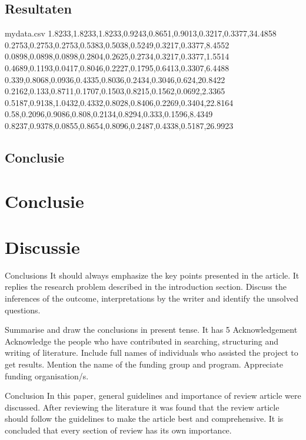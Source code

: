 \documentclass{article}
\begin{document}
	\subsection{Resultaten}
	 \begin{filecontents*}{mydata.csv}
		1.8233,1.8233,1.8233,0.9243,0.8651,0.9013,0.3217,0.3377,34.4858
		0.2753,0.2753,0.2753,0.5383,0.5038,0.5249,0.3217,0.3377,8.4552
		0.0898,0.0898,0.0898,0.2804,0.2625,0.2734,0.3217,0.3377,1.5514
		0.4689,0.1193,0.0417,0.8046,0.2227,0.1795,0.6413,0.3307,6.4488
		0.339,0.8068,0.0936,0.4335,0.8036,0.2434,0.3046,0.624,20.8422
		0.2162,0.133,0.8711,0.1707,0.1503,0.8215,0.1562,0.0692,2.3365
		0.5187,0.9138,1.0432,0.4332,0.8028,0.8406,0.2269,0.3404,22.8164
		0.58,0.2096,0.9086,0.808,0.2134,0.8294,0.333,0.1596,8.4349
		0.8237,0.9378,0.0855,0.8654,0.8096,0.2487,0.4338,0.5187,26.9923 
	\end{filecontents*}

\subsection{Conclusie}


	\newpage
		\section{Conclusie}
		
		
		
			\newpage
		\section{Discussie}
		Conclusions
		It should always emphasize the key points presented in the article.
		It replies the research problem described in the introduction section. Discuss the inferences of the outcome, interpretations by the writer and identify the unsolved questions. 
		
		Summarise and draw the conclusions in present tense. It has 5%
		Acknowledgement
		Acknowledge the people who have contributed in searching, structuring and writing of literature. Include full names of individuals who assisted the project to get results. Mention the name of the funding group and program. 
		Appreciate funding organisation/s.
		
		
		
		Conclusion
		In this paper, general guidelines and importance of review 
		article were discussed. After reviewing the literature it was found that the review article should follow the guidelines to make the article best and comprehensive. It is concluded that every section of review has its own importance.
		
\end{document}
